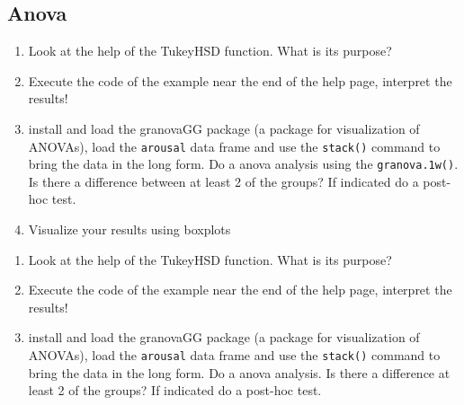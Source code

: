 \documentclass[11pt]{article}
\begin{document}
\subsection{Anova}
  \begin{enumerate}
  \item Look at the help of the TukeyHSD function. What is its purpose? 
  \item Execute the code of the example near the end of the help page, interpret the results!
  \item install and load the granovaGG package (a package for visualization of ANOVAs), load the \texttt{arousal} data frame and use the \texttt{stack()} command to bring the data in the long form. Do a anova analysis using the \texttt{granova.1w()}. Is there a difference between at least 2 of the groups? If indicated do a post-hoc test.
  \item Visualize your results using boxplots
  \end{enumerate}
  \begin{enumerate}
  \item Look at the help of the TukeyHSD function. What is its purpose? 
  \item Execute the code of the example near the end of the help page, interpret the results!
  \item install and load the granovaGG package (a package for visualization of ANOVAs), load the \texttt{arousal} data frame and use the \texttt{stack()} command to bring the data in the long form. Do a anova analysis. Is there a difference at least 2 of the groups? If indicated do a post-hoc test.
  \end{enumerate}
\end{document}
